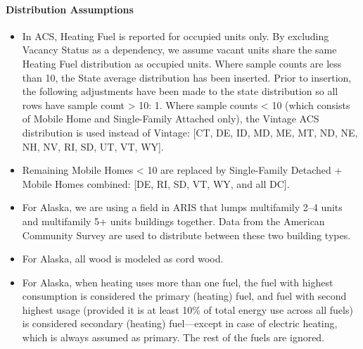\paragraph{Distribution Assumptions}
% 
\begin{itemize}
    \item In ACS, Heating Fuel is reported for occupied units only. By excluding Vacancy Status as a dependency, we assume vacant units share the same Heating Fuel distribution as occupied units. Where sample counts are less than 10, the State average distribution has been inserted. Prior to insertion, the following adjustments have been made to the state distribution so all rows have sample count > 10: 1. Where sample counts < 10 (which consists of Mobile Home and Single-Family Attached only), the Vintage ACS distribution is used instead of Vintage: [CT, DE, ID, MD, ME, MT, ND, NE, NH, NV, RI, SD, UT, VT, WY].
    \item Remaining Mobile Homes < 10 are replaced by Single-Family Detached + Mobile Homes combined: [DE, RI, SD, VT, WY, and all DC].
    \item For Alaska, we are using a field in ARIS that lumps multifamily 2--4 units and multifamily 5+ units buildings together. Data from the American Community Survey are used to distribute between these two building types.
    \item For Alaska, all wood is modeled as cord wood.
    \item For Alaska, when heating uses more than one fuel, the fuel with highest consumption is considered the primary (heating) fuel, and fuel with second highest usage (provided it is at least 10\% of total energy use across all fuels) is considered secondary (heating) fuel---except in case of electric heating, which is always assumed as primary. The rest of the fuels are ignored.
\end{itemize}
